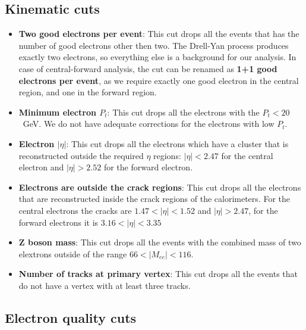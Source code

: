 \subsection{Kinematic cuts}
\label{sec:Sel_kinematic}

\begin{itemize}
\item {\bfseries Two good electrons per event}: This cut drops all the events that has the number of good electrons other then two. The Drell-Yan process produces exactly two electrons, so everything else is a background for our analysis. In case of central-forward analysis, the cut can be renamed as {\bfseries 1+1 good electrons per event}, as we require exactly one good electron in the central region, and one in the forward region.
\item {\bfseries Minimum electron $P_{t}$}: This cut drops all the electrons with the $P_{t} < 20$~GeV. We do not have adequate corrections for the electrons with low $P_{t}$.
\item {\bfseries Electron $|\eta|$}: This cut drops all the electrons which have a cluster that is reconstructed outside the required $\eta$ regions: $|\eta| < 2.47$ for the central electron and $|\eta| > 2.52$ for the forward electron.
\item {\bfseries Electrons are outside the crack regions}: This cut drops all the electrons that are reconstructed inside the crack regions of the calorimeters. For the central electrons the cracks are $1.47 < |\eta| < 1.52$ and $|\eta| > 2.47$, for the forward electrons it is $3.16 < |\eta| < 3.35$
\item {\bfseries Z boson mass}: This cut drops all the events with the combined mass of two elextrons outside of the range $66 < |M_{ee}| < 116$.
\item {\bfseries Number of tracks at primary vertex}: This cut drops all the events that do not have a vertex with at least three tracks.
\end{itemize}

\subsection{Electron quality cuts}
\label{sec:Sel_isem_iso}


